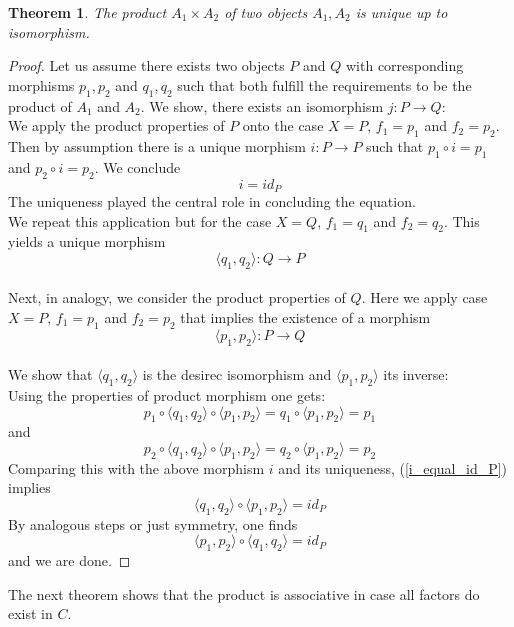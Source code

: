 \documentclass[17pt]{extarticle}
\newtheorem{theorem}{Theorem}
\begin{document}
\begin{theorem} \label{product_isomorphy}
	The product $A_1\times A_2$ of two objects $A_1, A_2$ is unique up to isomorphism.
\end{theorem}
\begin{proof}
	Let us assume there exists two objects $P$ and $Q$ with corresponding morphisms $p_1, p_2$ and $q_1, q_2$ such that both fulfill the requirements to be the product of $A_1$ and $A_2$. We show, there exists an isomorphism $j:P\rightarrow Q$:\\
	 We apply the product properties of $P$ onto the case $X=P$, $f_1=p_1$ and $f_2=p_2$. Then by assumption there is a unique morphism $i:P\rightarrow P$ such that $p_1\circ i = p_1$ and $p_2\circ i = p_2$. We conclude 
	\begin{equation} \label{i_equal_id_P}
	i=id_P
    \end{equation}
    The uniqueness played the central role in concluding the equation.\\
    We repeat this application but for the case $X=Q$, $f_1=q_1$ and $f_2=q_2$. This yields a unique morphism 
    $$\langle q_1,q_2 \rangle:Q\rightarrow P$$\\
    Next, in analogy, we consider the product properties of $Q$.
    Here we apply case $X=P$, $f_1=p_1$ and $f_2=p_2$ that implies the existence of  a morphism
    $$\langle p_1,p_2 \rangle:P\rightarrow Q$$\\
    We show that $\langle q_1,q_2 \rangle$ is the desirec isomorphism and $\langle p_1,p_2 \rangle$ its inverse:\\
     Using the properties of product morphism one gets:
    $$
    p_1\circ \langle q_1,q_2 \rangle \circ \langle p_1,p_2 \rangle = q_1\circ  \langle p_1,p_2 \rangle=p_1
    $$
    and
    $$
    p_2\circ \langle q_1,q_2 \rangle \circ \langle p_1,p_2 \rangle = q_2\circ  \langle p_1,p_2 \rangle=p_2
    $$
    Comparing this with the above morphism $i$ and its uniqueness, (\ref{i_equal_id_P}) implies
    $$
    \langle q_1,q_2 \rangle \circ \langle p_1,p_2 \rangle=id_P
    $$
    By analogous steps or just symmetry, one finds
    $$
    \langle p_1,p_2 \rangle \circ  \langle q_1,q_2 \rangle=id_P
    $$
    and we are done.	 
\end{proof}
The next theorem shows that the product is associative in case all factors do exist in $C$.
\end{document}

